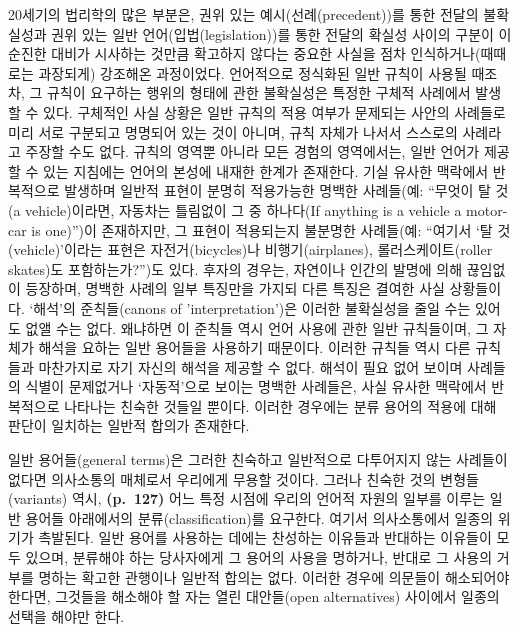 20세기의 법리학의 많은 부분은, 권위 있는 예시(선례(precedent))를 통한
전달의 불확실성과 권위 있는 일반 언어(입법(legislation))를 통한 전달의
확실성 사이의 구분이 이 순진한 대비가 시사하는 것만큼 확고하지 않다는
중요한 사실을 점차 인식하거나(때때로는 과장되게) 강조해온 과정이었다.
언어적으로 정식화된 일반 규칙이 사용될 때조차, 그 규칙이 요구하는 행위의
형태에 관한 불확실성은 특정한 구체적 사례에서 발생할 수 있다. 구체적인
사실 상황은 일반 규칙의 적용 여부가 문제되는 사안의 사례들로 미리 서로
구분되고 명명되어 있는 것이 아니며, 규칙 자체가 나서서 스스로의 사례라고
주장할 수도 없다. 규칙의 영역뿐 아니라 모든 경험의 영역에서는, 일반
언어가 제공할 수 있는 지침에는 언어의 본성에 내재한 한계가 존재한다.
기실 유사한 맥락에서 반복적으로 발생하며 일반적 표현이 분명히 적용가능한
명백한 사례들(예: “무엇이 탈 것(a vehicle)이라면, 자동차는 틀림없이 그
중 하나다(If anything is a vehicle a motor-car is one)”)이 존재하지만,
그 표현이 적용되는지 불분명한 사례들(예: “여기서 ‘탈 것(vehicle)’이라는
표현은 자전거(bicycles)나 비행기(airplanes), 롤러스케이트(roller
skates)도 포함하는가?”)도 있다. 후자의 경우는, 자연이나 인간의 발명에
의해 끊임없이 등장하며, 명백한 사례의 일부 특징만을 가지되 다른 특징은
결여한 사실 상황들이다. ‘해석’의 준칙들(canons of 'interpretation')은
이러한 불확실성을 줄일 수는 있어도 없앨 수는 없다. 왜냐하면 이 준칙들
역시 언어 사용에 관한 일반 규칙들이며, 그 자체가 해석을 요하는 일반
용어들을 사용하기 때문이다. 이러한 규칙들 역시 다른 규칙들과 마찬가지로
자기 자신의 해석을 제공할 수 없다. 해석이 필요 없어 보이며 사례들의
식별이 문제없거나 ‘자동적’으로 보이는 명백한 사례들은, 사실 유사한
맥락에서 반복적으로 나타나는 친숙한 것들일 뿐이다. 이러한 경우에는 분류
용어의 적용에 대해 판단이 일치하는 일반적 합의가 존재한다.

일반 용어들(general terms)은 그러한 친숙하고 일반적으로 다투어지지 않는
사례들이 없다면 의사소통의 매체로서 우리에게 무용할 것이다. 그러나
친숙한 것의 변형들(variants) 역시, \textbf{(p.~127)} 어느 특정 시점에
우리의 언어적 자원의 일부를 이루는 일반 용어들 아래에서의
분류(classification)를 요구한다. 여기서 의사소통에서 일종의 위기가
촉발된다. 일반 용어를 사용하는 데에는 찬성하는 이유들과 반대하는
이유들이 모두 있으며, 분류해야 하는 당사자에게 그 용어의 사용을
명하거나, 반대로 그 사용의 거부를 명하는 확고한 관행이나 일반적 합의는
없다. 이러한 경우에 의문들이 해소되어야 한다면, 그것들을 해소해야 할
자는 열린 대안들(open alternatives) 사이에서 일종의 선택을 해야만 한다.

